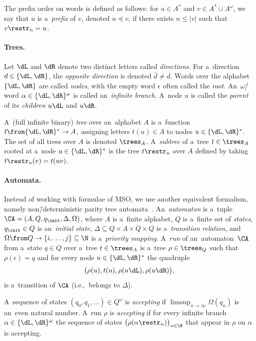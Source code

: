 The prefix order on words is defined as follows: for $u\in A^\ast$ and $v\in A^\ast\cup A^\omega$, we say that $u$ is a~\emph{prefix} of $v$, denoted $u\preceq v$, if there exists $n\leq |v|$ such that $v\restr_n = u$.


\paragraph*{Trees.}
Let $\dL$ and $\dR$ denote two distinct letters called \emph{directions}.
For a~direction $d\in\{\dL,\dR\}$, the \emph{opposite direction} is denoted $\bar{d}\neq d$.
Words over the alphabet $\{\dL,\dR\}$ are called \emph{nodes}, with the empty word $\epsilon$ often called the \emph{root}.
An~$\omega$\=/word $\alpha\in\{\dL,\dR\}^\omega$ is called an~\emph{infinite branch}.
A~node $u$ is called the \emph{parent} of its \emph{children} $u \dL$ and $u\dR$.

A~(full infinite binary) \emph{tree} over an~alphabet $A$ is a~function $t\from \{\dL,\dR\}^\ast\to A$, assigning letters $t(u)\in A$ to nodes $u\in\{\dL,\dR\}^\ast$.
The set of all trees over $A$ is denoted $\trees_A$.
A~\emph{subtree} of a~tree $t\in\trees_A$ rooted at a~node $u\in\{\dL,\dR\}^\ast$ is the tree $t\restr_u$ over $A$ defined by taking $t\restr_u(v) = t(uv)$.


\paragraph*{Automata.}
Instead of working with formulae of MSO, we use another equivalent formalism, namely non\=/deterministic parity tree automata~\cite{thomas_languages}.
An~\emph{automaton} is a~tuple $\CA=(A,Q, q_{\init}, \Delta,\Omega)$, where $A$ is a~finite alphabet, $Q$ is a~finite set of \emph{states}, $q_{\init}\in Q$ is an~\emph{initial state},
$\Delta\subseteq Q\times A\times Q\times Q$ is a~\emph{transition relation}, and $\Omega\from Q\to \{i,\ldots,j\}\subseteq \N$ is a~\emph{priority mapping}.
A~\emph{run} of an~automaton~$\CA$ from a~state $q\in Q$ over a~tree $t\in\trees_A$ is a~tree $\rho\in\trees_Q$ such that $\rho(\epsilon)=q$ and for every node $u\in\{\dL,\dR\}^\ast$ the quadruple
\[\big(\rho(u), t(u), \rho(u\dL),\rho(u \dR)\big),\]
is a~transition of $\CA$ (i.e.,~belongs to $\Delta$).

A~sequence of states $(q_0,q_1,\ldots)\in Q^\omega$ is \emph{accepting} if $\limsup_{n\to\infty} \Omega(q_n)$ is an~even natural number.
A~run $\rho$ is \emph{accepting} if for every infinite branch $\alpha\in\{\dL,\dR\}^\omega$ the sequence of states $\big(\rho(\alpha\restr_n)\big)_{n\in\N}$ that appear in $\rho$ on $\alpha$ is accepting.

